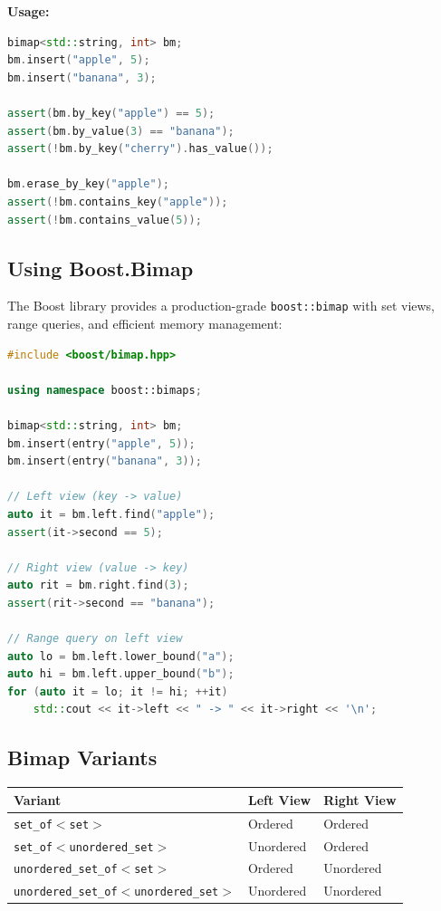 \textbf{Usage:}
\begin{lstlisting}[language=C++]
bimap<std::string, int> bm;
bm.insert("apple", 5);
bm.insert("banana", 3);

assert(bm.by_key("apple") == 5);
assert(bm.by_value(3) == "banana");
assert(!bm.by_key("cherry").has_value());

bm.erase_by_key("apple");
assert(!bm.contains_key("apple"));
assert(!bm.contains_value(5));
\end{lstlisting}

\subsection{Using Boost.Bimap}

The Boost library provides a production-grade \texttt{boost::bimap} with set views, range queries, and efficient memory management:

\begin{lstlisting}[language=C++]
#include <boost/bimap.hpp>

using namespace boost::bimaps;

bimap<std::string, int> bm;
bm.insert(entry("apple", 5));
bm.insert(entry("banana", 3));

// Left view (key -> value)
auto it = bm.left.find("apple");
assert(it->second == 5);

// Right view (value -> key)
auto rit = bm.right.find(3);
assert(rit->second == "banana");

// Range query on left view
auto lo = bm.left.lower_bound("a");
auto hi = bm.left.upper_bound("b");
for (auto it = lo; it != hi; ++it)
    std::cout << it->left << " -> " << it->right << '\n';
\end{lstlisting}

\subsection{Bimap Variants}

\begin{center}
\begin{tabular}{lll}
\toprule
Variant & Left View & Right View \\
\midrule
\texttt{set\_of$<$set$>$} & Ordered & Ordered \\
\texttt{set\_of$<$unordered\_set$>$} & Unordered & Ordered \\
\texttt{unordered\_set\_of$<$set$>$} & Ordered & Unordered \\
\texttt{unordered\_set\_of$<$unordered\_set$>$} & Unordered & Unordered \\
\bottomrule
\end{tabular}
\end{center}

